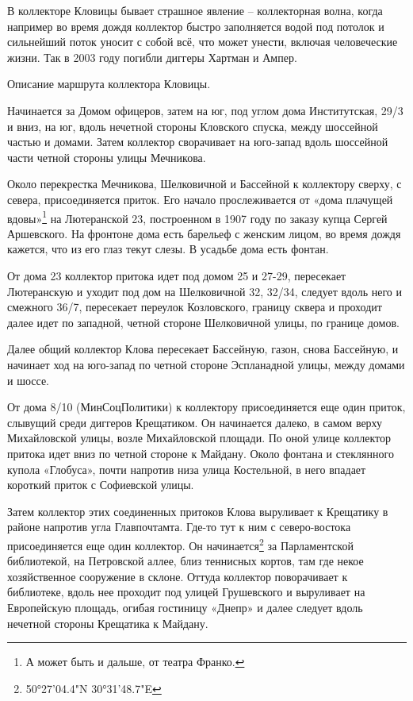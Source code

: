 В коллекторе Кловицы бывает страшное явление – коллекторная волна, когда например во время дождя коллектор быстро заполняется водой под потолок и сильнейший поток уносит с собой всё, что может унести, включая человеческие жизни. Так в 2003 году погибли диггеры Хартман и Ампер.

Описание маршрута коллектора Кловицы.

Начинается за Домом офицеров, затем на юг, под углом дома Институтская, 29/3 и вниз, на юг, вдоль нечетной стороны Кловского спуска, между шоссейной частью и домами. Затем коллектор сворачивает на юго-запад вдоль шоссейной части четной стороны улицы Мечникова.

Около перекрестка Мечникова, Шелковичной и Бассейной к коллектору сверху, с севера, присоединяется приток. Его начало прослеживается от «дома плачущей вдовы»\footnote{А может быть и дальше, от театра Франко.} на Лютеранской 23, построенном в 1907 году по заказу купца Сергей Аршевского. На фронтоне дома есть барельеф с женским лицом, во время дождя кажется, что из его глаз текут слезы. В усадьбе дома есть фонтан.

От дома 23 коллектор притока идет под домом 25 и 27-29, пересекает Лютеранскую и уходит под дом на Шелковичной 32, 32/34, следует вдоль него и смежного 36/7, пересекает переулок Козловского, границу сквера и проходит далее идет по западной, четной стороне Шелковичной улицы, по границе домов.

Далее общий коллектор Клова пересекает Бассейную, газон, снова Бассейную, и начинает ход на юго-запад по четной стороне Эспланадной улицы, между домами и шоссе.

От дома 8/10 (МинСоцПолитики) к коллектору присоединяется еще один приток, слывущий среди диггеров Крещатиком. Он начинается далеко, в самом верху Михайловской улицы, возле Михайловской площади. По оной улице коллектор притока идет вниз по четной стороне к Майдану. Около фонтана и стеклянного купола «Глобуса», почти напротив низа улица Костельной, в него впадает короткий приток с Софиевской улицы.

Затем коллектор этих соединенных притоков Клова выруливает к Крещатику в районе напротив угла Главпочтамта. Где-то тут к ним с северо-востока присоединяется еще один коллектор. Он начинается\footnote{50°27'04.4"N 30°31'48.7"E} за Парламентской библиотекой, на Петровской аллее, близ теннисных кортов, там где некое хозяйственное сооружение в склоне. Оттуда коллектор поворачивает к библиотеке, вдоль нее проходит под улицей Грушевского и выруливает на Европейскую площадь, огибая гостиницу «Днепр» и далее следует вдоль нечетной стороны Крещатика к Майдану.

